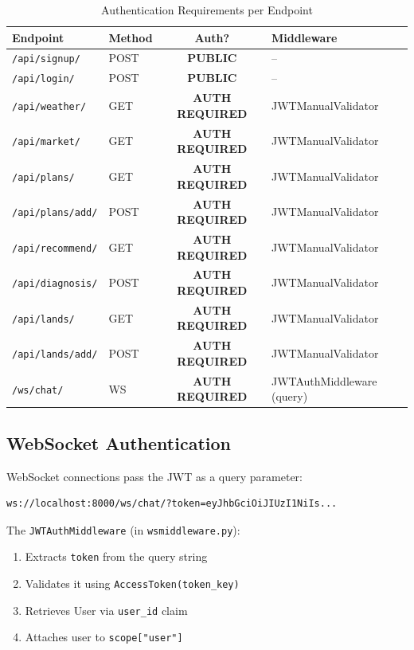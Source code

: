 \documentclass[11pt,a4paper]{article}
\newcommand{\authbadge}{\textcolor{lockgold}{\textbf{AUTH REQUIRED}}}
\newcommand{\publicbadge}{\textcolor{publicgreen}{\textbf{PUBLIC}}}
\begin{document}
\begin{table}[H]
\centering
\begin{tabular}{l l c l}
\toprule
\textbf{Endpoint} & \textbf{Method} & \textbf{Auth?} & \textbf{Middleware} \\
\midrule
\texttt{/api/signup/}      & POST & \publicbadge  & -- \\
\texttt{/api/login/}       & POST & \publicbadge  & -- \\
\texttt{/api/weather/}     & GET  & \authbadge    & JWTManualValidator \\
\texttt{/api/market/}      & GET  & \authbadge    & JWTManualValidator \\
\texttt{/api/plans/}       & GET  & \authbadge    & JWTManualValidator \\
\texttt{/api/plans/add/}   & POST & \authbadge    & JWTManualValidator \\
\texttt{/api/recommend/}   & GET  & \authbadge    & JWTManualValidator \\
\texttt{/api/diagnosis/}   & POST & \authbadge    & JWTManualValidator \\
\texttt{/api/lands/}       & GET  & \authbadge    & JWTManualValidator \\
\texttt{/api/lands/add/}   & POST & \authbadge    & JWTManualValidator \\
\texttt{/ws/chat/}         & WS   & \authbadge    & JWTAuthMiddleware (query) \\
\bottomrule
\end{tabular}
\caption{Authentication Requirements per Endpoint}
\end{table}

\subsection{WebSocket Authentication}

WebSocket connections pass the JWT as a query parameter:

\begin{lstlisting}[style=bashStyle]
ws://localhost:8000/ws/chat/?token=eyJhbGciOiJIUzI1NiIs...
\end{lstlisting}

The \texttt{JWTAuthMiddleware} (in \texttt{wsmiddleware.py}):
\begin{enumerate}[noitemsep]
    \item Extracts \texttt{token} from the query string
    \item Validates it using \texttt{AccessToken(token\_key)}
    \item Retrieves User via \texttt{user\_id} claim
    \item Attaches user to \texttt{scope["user"]}
\end{enumerate}
\end{document}
